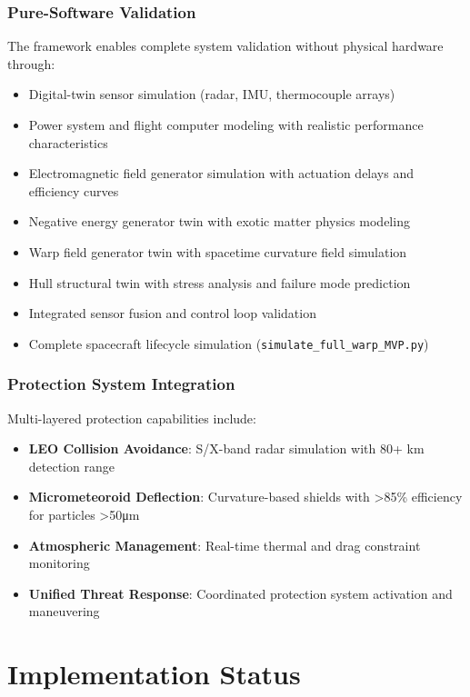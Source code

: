 \documentclass[11pt]{article}
\begin{document}
\subsubsection{Pure-Software Validation}
The framework enables complete system validation without physical hardware through:
\begin{itemize}
\item Digital-twin sensor simulation (radar, IMU, thermocouple arrays)
\item Power system and flight computer modeling with realistic performance characteristics
\item Electromagnetic field generator simulation with actuation delays and efficiency curves
\item Negative energy generator twin with exotic matter physics modeling
\item Warp field generator twin with spacetime curvature field simulation
\item Hull structural twin with stress analysis and failure mode prediction
\item Integrated sensor fusion and control loop validation
\item Complete spacecraft lifecycle simulation (\texttt{simulate\_full\_warp\_MVP.py})
\end{itemize}

\subsubsection{Protection System Integration}
Multi-layered protection capabilities include:
\begin{itemize}
\item \textbf{LEO Collision Avoidance}: S/X-band radar simulation with 80+ km detection range
\item \textbf{Micrometeoroid Deflection}: Curvature-based shields with >85\% efficiency for particles >50μm
\item \textbf{Atmospheric Management}: Real-time thermal and drag constraint monitoring
\item \textbf{Unified Threat Response}: Coordinated protection system activation and maneuvering
\end{itemize}

\section{Implementation Status}
\end{document}
